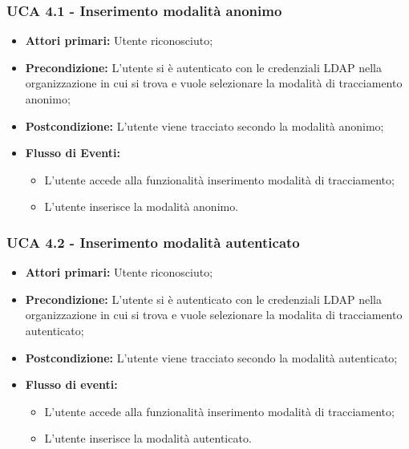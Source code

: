 \subsubsection{UCA 4.1 - Inserimento modalità anonimo}%
\begin{itemize}
\item \textbf{Attori primari:} Utente riconosciuto;
\item \textbf{Precondizione:} L'utente si è autenticato con le credenziali LDAP nella organizzazione in cui si trova e vuole selezionare la modalità di tracciamento anonimo;
\item \textbf{Postcondizione:}  L'utente viene tracciato secondo la modalità anonimo;
\item \textbf{Flusso di Eventi:}
	\begin{itemize}
	\item L'utente accede alla funzionalità inserimento modalità di tracciamento; 
	\item L'utente inserisce la modalità anonimo.
\end{itemize}
\end{itemize}

\subsubsection{UCA 4.2 - Inserimento modalità autenticato}%
\begin{itemize}
	\item \textbf{Attori primari:} Utente riconosciuto;
	\item \textbf{Precondizione:} L'utente si è autenticato con le credenziali LDAP nella organizzazione in cui si trova e vuole selezionare la modalita di tracciamento autenticato;
	\item \textbf{Postcondizione:}  L'utente viene tracciato secondo la modalità autenticato;
	\item \textbf{Flusso di eventi:}
	\begin{itemize}
		\item L'utente accede alla funzionalità inserimento modalità di tracciamento;
		\item L'utente inserisce la modalità autenticato.
	\end{itemize}
\end{itemize}

